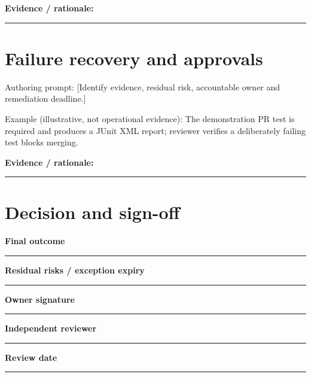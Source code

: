 \documentclass[11pt,letterpaper]{article}
\begin{document}
\noindent\textbf{Evidence / rationale:}\par\nobreak\vspace{8pt}\noindent\rule{0.93\linewidth}{0.4pt}\par\vspace{14pt}
\section{Failure recovery and approvals}
Authoring prompt: [Identify evidence, residual risk, accountable owner and remediation deadline.]

Example (illustrative, not operational evidence): The demonstration PR test is required and produces a JUnit XML report; reviewer verifies a deliberately failing test blocks merging.

\noindent\textbf{Evidence / rationale:}\par\nobreak\vspace{8pt}\noindent\rule{0.93\linewidth}{0.4pt}\par\vspace{14pt}
\section{Decision and sign-off}
\noindent\textbf{Final outcome}\par\nobreak\vspace{6pt}\noindent\rule{0.93\linewidth}{0.4pt}\par\vspace{14pt}
\noindent\textbf{Residual risks / exception expiry}\par\nobreak\vspace{6pt}\noindent\rule{0.93\linewidth}{0.4pt}\par\vspace{14pt}
\noindent\textbf{Owner signature}\par\nobreak\vspace{6pt}\noindent\rule{0.93\linewidth}{0.4pt}\par\vspace{14pt}
\noindent\textbf{Independent reviewer}\par\nobreak\vspace{6pt}\noindent\rule{0.93\linewidth}{0.4pt}\par\vspace{14pt}
\noindent\textbf{Review date}\par\nobreak\vspace{6pt}\noindent\rule{0.93\linewidth}{0.4pt}\par\vspace{14pt}
\end{document}
